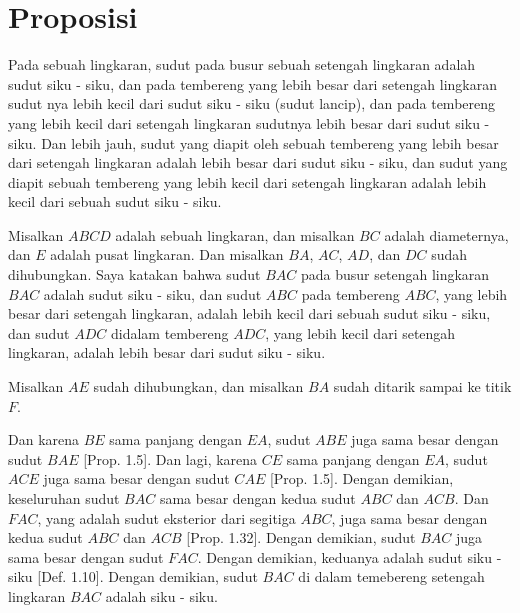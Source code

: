 \documentclass[a4paper]{book}
\begin{document}
\section*{\centering Proposisi \thesection}
Pada sebuah lingkaran, sudut pada busur sebuah setengah lingkaran adalah sudut
siku - siku, dan pada tembereng yang lebih besar dari setengah lingkaran 
sudut nya lebih kecil dari sudut siku - siku (sudut lancip), dan pada tembereng
yang lebih kecil dari setengah lingkaran sudutnya lebih besar dari sudut siku
- siku. Dan lebih jauh, sudut yang diapit oleh sebuah tembereng yang 
lebih besar dari setengah lingkaran adalah lebih besar dari sudut siku - siku,
dan sudut
yang diapit sebuah tembereng yang lebih kecil dari setengah lingkaran
adalah lebih kecil dari sebuah sudut siku - siku.
\begin{center}
\end{center}
Misalkan $ABCD$ adalah sebuah lingkaran, dan misalkan $BC$ adalah diameternya,
dan $E$ adalah pusat lingkaran. Dan misalkan $BA$, $AC$, $AD$, dan $DC$ sudah
dihubungkan. Saya katakan bahwa sudut $BAC$ pada busur 
setengah lingkaran $BAC$ adalah sudut siku - siku, dan sudut $ABC$ pada 
tembereng $ABC$, yang lebih besar dari setengah lingkaran, adalah lebih kecil
dari sebuah sudut siku - siku, dan sudut $ADC$ didalam tembereng $ADC$, yang
lebih kecil dari setengah lingkaran, adalah lebih besar dari sudut siku - siku.

Misalkan $AE$ sudah dihubungkan, dan misalkan $BA$ sudah ditarik sampai ke
titik $F$.

Dan karena $BE$ sama panjang dengan $EA$, sudut $ABE$ juga sama besar dengan
sudut $BAE$ [Prop. 1.5]. Dan lagi, karena $CE$ sama panjang dengan $EA$, sudut
$ACE$ juga sama besar dengan sudut $CAE$ [Prop. 1.5]. Dengan demikian, 
keseluruhan sudut $BAC$ sama besar dengan kedua sudut $ABC$ dan $ACB$.
Dan $FAC$, yang adalah sudut eksterior dari segitiga $ABC$, juga
sama besar dengan kedua sudut $ABC$ dan $ACB$ [Prop. 1.32]. Dengan demikian,
sudut $BAC$ juga sama besar dengan sudut $FAC$. Dengan demikian, keduanya
adalah sudut siku - siku [Def. 1.10]. Dengan demikian, sudut $BAC$ di dalam
temebereng setengah lingkaran $BAC$ adalah siku - siku.
\end{document}
